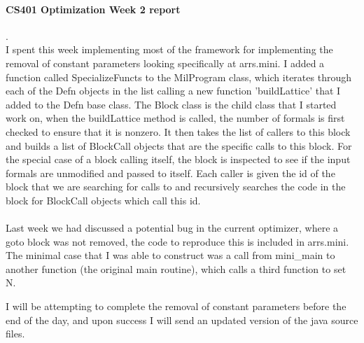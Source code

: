 \documentclass[10pt]{article}
\author{Joel Anna<annajoel@pdx.edu>}
\begin{document}
\paragraph{CS401 Optimization Week 2 report} 
.\\
I spent this week implementing most of the framework for implementing the removal of constant parameters looking specifically at arrs.mini.
I added a function called SpecializeFuncts to the MilProgram class, which iterates through each of the Defn objects in the list calling a new function
'buildLattice' that I added to the Defn base class.
The Block class is the child class that I started work on, when the buildLattice method is called, the number of formals is first checked to ensure that it is nonzero. It then takes the list of callers to this block and builds a list of BlockCall objects that are the specific calls to this block. For the special case of a block calling itself, the block is inspected to see if the input formals are unmodified and passed to itself. 
Each caller is given the id of the block that we are searching for calls to and recursively searches the code in the block for BlockCall objects which call this id.
\paragraph{}
Last week we had discussed a potential bug in the current optimizer, where a goto block was not removed, the code to reproduce this is included in arrs.mini. The minimal case that I was able to construct was a call from mini\_main to another function (the original main routine), which calls a third function to set N.

I will be attempting to complete the removal of constant parameters before the end of the day, and upon success I will send an updated version of the java source files.
\end{document}
